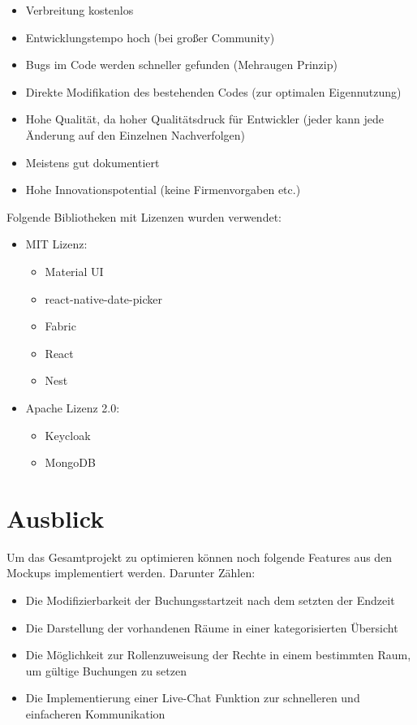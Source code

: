 \begin{itemize}
    \item	Verbreitung kostenlos
    \item   Entwicklungstempo hoch (bei großer Community)
    \item   Bugs im Code werden schneller gefunden (Mehraugen Prinzip)
    \item	Direkte Modifikation des bestehenden Codes (zur optimalen Eigennutzung)
    \item	Hohe Qualität, da hoher Qualitätsdruck für Entwickler (jeder kann jede Änderung auf den Einzelnen Nachverfolgen)
    \item	Meistens gut dokumentiert
    \item	Hohe Innovationspotential (keine Firmenvorgaben etc.)
\end{itemize}

Folgende Bibliotheken mit Lizenzen wurden verwendet:

\begin{itemize}
\item	MIT Lizenz:
\begin{itemize}
    \item	Material UI
    \item	react-native-date-picker
    \item	Fabric
    \item	React
    \item	Nest
\end{itemize}
\end{itemize}
\begin{itemize}
    \item	Apache Lizenz 2.0:
    \begin{itemize}
\item	Keycloak
\item	MongoDB
\end{itemize}
\end{itemize}


\section{Ausblick}

Um das Gesamtprojekt zu optimieren können noch folgende Features aus den Mockups implementiert werden.
Darunter Zählen:

\begin{itemize}
    \item	Die Modifizierbarkeit der Buchungsstartzeit nach dem setzten der Endzeit
    \item	Die Darstellung der vorhandenen Räume in einer kategorisierten Übersicht
    \item	Die Möglichkeit zur Rollenzuweisung der Rechte in einem bestimmten Raum, um gültige Buchungen zu setzen
    \item	Die Implementierung einer Live-Chat Funktion zur schnelleren und einfacheren Kommunikation
\end{itemize}

